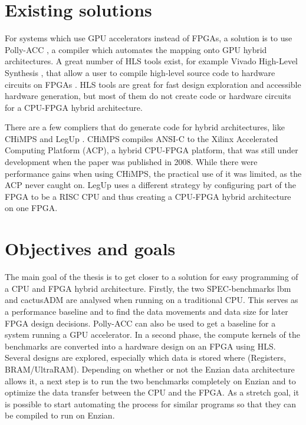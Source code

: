 \documentclass[10pt]{article}
\begin{document}
\section*{Existing solutions}
For systems which use GPU accelerators instead of FPGAs, a solution is to use
Polly-ACC \cite{Polly_ACC}, a compiler which automates the mapping onto GPU
hybrid architectures.
A great number of HLS tools exist, for example Vivado High-Level Synthesis
\cite{Vivado_HLS}, that allow a user to compile high-level source code to
hardware circuits on FPGAs \cite{HLS_overview}. HLS tools are great for fast
design exploration and accessible hardware generation, but most of them do not
create code or hardware circuits for a CPU-FPGA hybrid architecture.

There are a few compliers that do generate code for hybrid architectures, like
CHiMPS \cite{CHiMPS} and LegUp \cite{LegUp}. CHiMPS compiles ANSI-C to the
Xilinx Accelerated Computing Platform (ACP), a hybrid CPU-FPGA platform, that
was still under development when the paper was published in 2008. While there
were performance gains when using CHiMPS, the practical use of it was limited,
as the ACP never caught on. LegUp uses a different strategy by configuring part
of the FPGA to be a RISC CPU and thus creating a CPU-FPGA hybrid architecture
on one FPGA.

\section*{Objectives and goals} The main goal of the thesis is to get closer to
a solution for easy programming of a CPU and FPGA hybrid architecture.
Firstly, the two SPEC-benchmarks lbm \cite{SPEC_lbm} and cactusADM
\cite{SPEC_cactusADM} are analysed when running on a traditional CPU. This
serves as a performance baseline and to find the data movements and data size
for later FPGA design decisions. Polly-ACC can also be used to get a baseline
for a system running a GPU accelerator.  In a second phase, the compute kernels
of the benchmarks are converted into a hardware design on an FPGA using HLS.
Several designs are explored, especially which data is stored where (Registers,
BRAM/UltraRAM).  Depending on whether or not the Enzian data architecture
allows it, a next step is to run the two benchmarks completely on Enzian and to
optimize the data transfer between the CPU and the FPGA.  As a stretch goal, it
is possible to start automating the process for similar programs so that they
can be compiled to run on Enzian.
\end{document}
